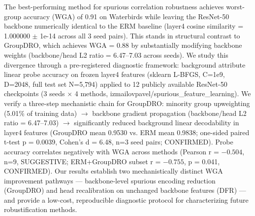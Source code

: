 
The best-performing method for spurious correlation robustness achieves worst-group accuracy (WGA) of 0.91 on Waterbirds while leaving the ResNet-50 backbone numerically identical to the ERM baseline (layer4 cosine similarity = 1.000000 $\pm$ 1e-14 across all 3 seed pairs). This stands in structural contrast to GroupDRO, which achieves WGA = 0.88 by substantially modifying backbone weights (backbone/head L2 ratio = 6.47--7.03 across seeds). We study this divergence through a pre-registered diagnostic framework: background attribute linear probe accuracy on frozen layer4 features (sklearn L-BFGS, C=1e9, D=2048, full test set N=5,794) applied to 12 publicly available ResNet-50 checkpoints (3 seeds $\times$ 4 methods, izmailovpavel/spurious\_feature\_learning). We verify a three-step mechanistic chain for GroupDRO: minority group upweighting (5.01\% of training data) $\rightarrow$ backbone gradient propagation (backbone/head L2 ratio = 6.47--7.03) $\rightarrow$ significantly reduced background linear decodability in layer4 features (GroupDRO mean 0.9530 vs. ERM mean 0.9838; one-sided paired t-test p = 0.0039, Cohen's d = 6.48, n=3 seed pairs; CONFIRMED). Probe accuracy correlates negatively with WGA across methods (Pearson r = $-0.504$, n=9, SUGGESTIVE; ERM+GroupDRO subset r = $-0.755$, p = 0.041, CONFIRMED). Our results establish two mechanistically distinct WGA improvement pathways --- backbone-level spurious encoding reduction (GroupDRO) and head recalibration on unchanged backbone features (DFR) --- and provide a low-cost, reproducible diagnostic protocol for characterizing future robustification methods.

